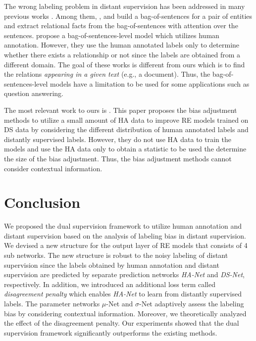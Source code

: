 \documentclass[11pt]{article}
\newcommand{\hanet}{\emph{HA-Net}\xspace}
\newcommand{\dsnet}{\emph{DS-Net}\xspace}
\newcommand{\munet}{$\mu$-Net\xspace}
\newcommand{\sigmanet}{$\sigma$-Net\xspace}
\begin{document}
The wrong labeling problem in distant supervision has been addressed in many previous works \cite{zeng2015distant,lin2016neural,ye2019distant,beltagy2018combining}.
Among them, ,  and  
build a bag-of-sentences for a pair of entities and extract relational facts from the bag-of-sentences with attention over the sentences.
 propose a bag-of-sentences-level model which utilizes human annotation.
However, they use the human annotated labels only to determine whether there exists a relationship or not since the labels are obtained from a different domain.
The goal of these works is different from ours which is to find the relations \emph{appearing in a given text} (e.g., a document). 
Thus, the bag-of-sentences-level models have a limitation to be used for some applications such as question answering.





The most relevant work to ours is \cite{ye2019looking}.
This paper proposes the bias adjustment methods to utilize a small amount of HA data to improve RE models trained on DS data 
by considering the different distribution of human annotated labels and distantly supervised labels.
However, they do not use HA data to train the models and use the HA data only to obtain a statistic to be used the determine the size of the bias adjustment.
Thus, the bias adjustment methods cannot consider contextual information.





 \section{Conclusion}
We proposed the dual supervision framework to utilize human annotation and distant supervision based on the analysis of labeling bias in distant supervision.
We devised a new structure for the output layer of RE models that consists of 4 sub networks.
The new structure is robust to the noisy labeling of distant supervision since the labels obtained by human annotation and distant supervision are predicted by separate prediction networks \hanet and \dsnet, respectively.
In addition, we introduced an additional loss term called \emph{disagreement penalty} which enables \hanet  to learn from distantly supervised labels.
The parameter networks \munet and \sigmanet adaptively assess the labeling bias by considering contextual information.
Moreover, we theoretically analyzed the effect of the disagreement penalty.
Our experiments showed that the dual supervision framework significantly outperforms the existing methods.
 



\end{document}
